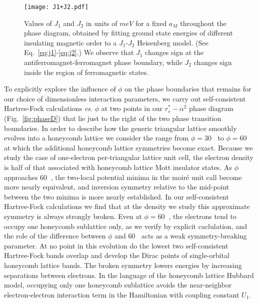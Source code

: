 \documentclass[%
 reprint,
 superscriptaddress,
 amsmath,amssymb,
 aps,
 prx,
 floatfix,
]{revtex4-2}
\newcommand{\<}{\langle}
\renewcommand{\>}{\rangle}
\renewcommand{\(}{\left(}
\renewcommand{\)}{\right)}
\renewcommand{\[}{\left[}
\renewcommand{\]}{\right]}
\DeclareMathOperator{\degree}{^{\circ}}
\begin{document}
\begin{figure}
    \centering
    \texttt{[image: J1+J2.pdf]}
    \caption{Values of $J_1$ and $J_2$ in units of $meV$ for a fixed $a_M$ throughout the phase diagram, obtained by fitting ground state energies of different insulating magnetic order to a $J_1$-$J_2$ Heisenberg model. (See Eq.~\eqref{eq:j1}-\eqref{eq:j2}.) We observe that $J_1$ changes sign at the antiferromagnet-ferromagnet phase boundary, while $J_2$ changes sign inside the region of ferromagnetic states.}
    \label{fig:js}
\end{figure}

To explicitly explore the influence of $\phi$ on the phase boundaries that remains for our choice of 
dimensionless interaction parameters, we carry out self-consistent Hartree-Fock calculations {\it vs.} $\phi$ at two points in our $r_s^*-\alpha^2$ phase diagram (Fig.~\ref{fig:phaseD}) that lie just to the right of the two phase transition boundaries.  In order to describe how the 
generic triangular lattice smoothly evolves into a honeycomb lattice we consider the range from $\phi = 30\degree$ to 
$\phi=60\degree$ at which the additional honeycomb lattice symmetries become exact. 
Because we study the case of one-electron per-triangular lattice unit cell,
the electron density is half of that associated with honeycomb lattice Mott insulator states.
As $\phi$ approaches $60 \degree$, the two-local potential minima in the moiré unit call become more nearly equivalent, and inversion 
symmetry relative to the mid-point between the two minima is more nearly established.  
In our self-consistent Hartree-Fock calculations we find that at the density we study this approximate symmetry is always strongly 
broken.  Even at $\phi=60\degree$, the electrons tend to occupy one honeycomb sublattice only, as we verify by explicit caclulation,
and the role of the 
difference between $\phi$ and $60 \degree$ acts as a weak symmetry-breaking parameter.  At no point in 
this evolution do the lowest two self-consistent Hartree-Fock bands overlap and develop the Dirac points of single-orbital 
honeycomb lattice bands.  The broken symmetry lowers energies by increasing separations between electrons.
In the language of the honeycomb lattice Hubbard model, occupying only one honeycomb sublattice
avoids the near-neighbor electron-electron interaction term in the Hamiltonian with coupling constant 
$U_1$. 
\end{document}
